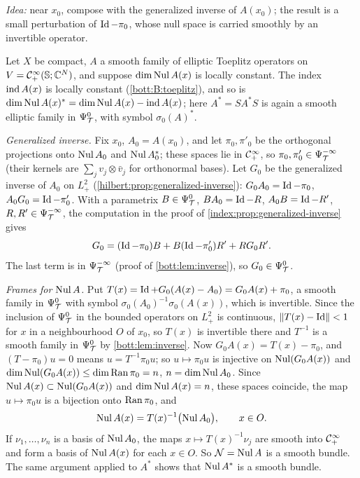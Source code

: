 \subsection*{}
\emph{Idea:} near $x_0$, compose with the generalized inverse of $A(x_0)$; the result is a
small perturbation of $\operatorname{Id}-\pi_0$, whose null space is carried smoothly by an invertible
operator.

Let $X$ be compact, $A$ a smooth family of elliptic Toeplitz operators on
$V=\mathcal{C}^\infty_+(\mathbb{S};\mathbb{C}^N)$, and suppose $\dim\operatorname{Nul} A(x)$ is locally constant. The index $\operatorname{ind} A(x)$
is locally constant (\ref{bott:B:toeplitz}), and so is
$\dim\operatorname{Nul} A(x)^*=\dim\operatorname{Nul} A(x)-\operatorname{ind} A(x)$; here $A^*=SA^*S$ is again a smooth elliptic family
in $\Psi^{0}_{\mathcal{T}}$, with symbol $\sigma_0(A)^*$.

\emph{Generalized inverse.} Fix $x_0$, $A_0=A(x_0)$, and let $\pi_0,\pi'_0$ be the orthogonal
projections onto $\operatorname{Nul} A_0$ and $\operatorname{Nul} A_0^*$; these spaces lie in $\mathcal{C}^\infty_+$, so
$\pi_0,\pi_0'\in\Psi^{-\infty}_{\mathcal{T}}$ (their kernels are $\sum_jv_j\otimes\bar v_j$ for orthonormal
bases). Let $G_0$ be the generalized inverse of $A_0$ on $L^2_+$
(\cref{hilbert:prop:generalized-inverse}): $G_0A_0=\operatorname{Id}-\pi_0$, $A_0G_0=\operatorname{Id}-\pi_0'$. With a
parametrix $B\in\Psi^{0}_{\mathcal{T}}$, $BA_0=\operatorname{Id}-R$, $A_0B=\operatorname{Id}-R'$, $R,R'\in\Psi^{-\infty}_{\mathcal{T}}$, the computation
in the proof of \cref{index:prop:generalized-inverse} gives
\begin{equation*}
  G_0=(\operatorname{Id}-\pi_0)B+B(\operatorname{Id}-\pi_0')R'+RG_0R'.
\end{equation*}
The last term is in $\Psi^{-\infty}_{\mathcal{T}}$ (proof of \cref{bott:lem:inverse}), so $G_0\in\Psi^{0}_{\mathcal{T}}$.

\emph{Frames for $\operatorname{Nul} A$.} Put $T(x)=\operatorname{Id}+G_0(A(x)-A_0)=G_0A(x)+\pi_0$, a smooth family in
$\Psi^{0}_{\mathcal{T}}$ with symbol $\sigma_0(A_0)^{-1}\sigma_0(A(x))$, which is invertible. Since the
inclusion of $\Psi^{0}_{\mathcal{T}}$ in the bounded operators on $L^2_+$ is continuous, $\lVert T(x)-\operatorname{Id}\rVert<1$
for $x$ in a neighbourhood $O$ of $x_0$, so $T(x)$ is invertible there and $T^{-1}$ is a
smooth family in $\Psi^{0}_{\mathcal{T}}$ by \cref{bott:lem:inverse}. Now $G_0A(x)=T(x)-\pi_0$, and
$(T-\pi_0)u=0$ means $u=T^{-1}\pi_0u$; so $u\mapsto\pi_0u$ is injective on $\operatorname{Nul}(G_0A(x))$ and
$\dim\operatorname{Nul}(G_0A(x))\le\dim\operatorname{Ran}\pi_0=n$, $n=\dim\operatorname{Nul} A_0$. Since $\operatorname{Nul} A(x)\subset\operatorname{Nul}(G_0A(x))$
and $\dim\operatorname{Nul} A(x)=n$, these spaces coincide, the map $u\mapsto\pi_0u$ is a bijection onto
$\operatorname{Ran}\pi_0$, and
\begin{equation*}
  \operatorname{Nul} A(x)=T(x)^{-1}\bigl(\operatorname{Nul} A_0\bigr),\qquad x\in O .
\end{equation*}
If $\nu_1,\dots,\nu_n$ is a basis of $\operatorname{Nul} A_0$, the maps $x\mapsto T(x)^{-1}\nu_j$ are smooth
into $\mathcal{C}^\infty_+$ and form a basis of $\operatorname{Nul} A(x)$ for each $x\in O$. So $\mathcal N=\operatorname{Nul} A$ is a smooth
bundle. The same argument applied to $A^*$ shows that $\operatorname{Nul} A^*$ is a smooth bundle.

